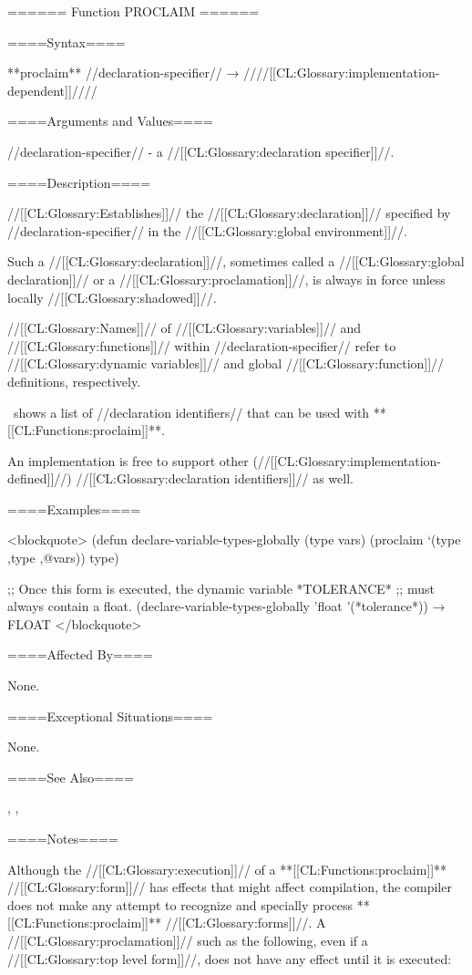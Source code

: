 ====== Function PROCLAIM ======

====Syntax====

**proclaim** //declaration-specifier// → ////[[CL:Glossary:implementation-dependent]]////

====Arguments and Values====

//declaration-specifier// - a //[[CL:Glossary:declaration specifier]]//.

====Description====

//[[CL:Glossary:Establishes]]// the //[[CL:Glossary:declaration]]// specified by //declaration-specifier// in the //[[CL:Glossary:global environment]]//.

Such a //[[CL:Glossary:declaration]]//, sometimes called a //[[CL:Glossary:global declaration]]// or a //[[CL:Glossary:proclamation]]//, is always in force unless locally //[[CL:Glossary:shadowed]]//.

//[[CL:Glossary:Names]]// of //[[CL:Glossary:variables]]// and //[[CL:Glossary:functions]]// within //declaration-specifier// refer to //[[CL:Glossary:dynamic variables]]// and global //[[CL:Glossary:function]]// definitions, respectively.

\Thenextfigure\ shows a list of //declaration identifiers// that can be used with **[[CL:Functions:proclaim]]**.


An implementation is free to support other (//[[CL:Glossary:implementation-defined]]//) //[[CL:Glossary:declaration identifiers]]// as well.

====Examples====

<blockquote> (defun declare-variable-types-globally (type vars) (proclaim `(type ,type ,@vars)) type)

;; Once this form is executed, the dynamic variable *TOLERANCE* ;; must always contain a float. (declare-variable-types-globally 'float '(*tolerance*)) → FLOAT </blockquote>

====Affected By====

None.

====Exceptional Situations====

None.

====See Also====

, , {\secref\Compilation}

====Notes====

Although the //[[CL:Glossary:execution]]// of a **[[CL:Functions:proclaim]]** //[[CL:Glossary:form]]// has effects that might affect compilation, the compiler does not make any attempt to recognize and specially process **[[CL:Functions:proclaim]]** //[[CL:Glossary:forms]]//. A //[[CL:Glossary:proclamation]]// such as the following, even if a //[[CL:Glossary:top level form]]//, does not have any effect until it is executed:

